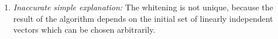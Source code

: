 \begin{enumerate}
\begin{solution}
\begin{enumerate}


    \item \emph{Inaccurate simple explanation:} The whitening is not
      unique, because the result of the algorithm depends on the
      initial set of linearly independent vectors which can be chosen
      arbitrarily.


\end{enumerate}
\end{solution}
\end{enumerate}
